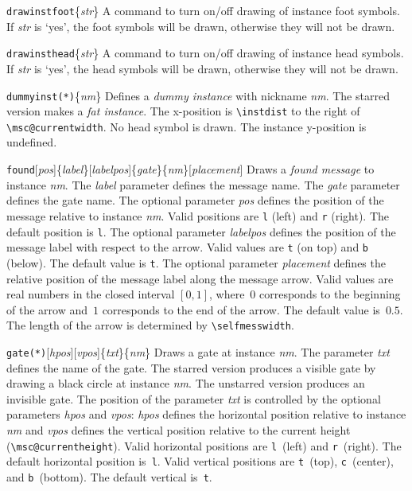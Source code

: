 \documentclass[a4paper]{article}
\newcommand{\cmd}[1]{\texttt{\bslash #1}}
\newcommand{\opt}[1]{[#1]}
\newenvironment{defs}{%
  \begin{list}{}%
              {\setlength{\labelwidth}{0pt}%
               \setlength{\labelsep}{1em}%
               \setlength{\leftmargin}{1em}%
               \setlength{\parsep}{1ex}%
               \setlength{\listparindent}{0pt}%
               \setlength{\rightmargin}{0pt}%
               \renewcommand{\makelabel}[1]{##1}%
               \raggedright%
              }%
  }{%
  \end{list}}
\begin{document}
\begin{defs}
\item[\cmd{drawinstfoot}\{\emph{str}\}] A command to turn on/off
drawing of instance foot symbols. If \emph{str} is `yes', the foot
symbols will be drawn, otherwise they will not be drawn.

\item[\cmd{drawinsthead}\{\emph{str}\}] A command to turn on/off
drawing of instance head symbols. If \emph{str} is `yes', the head
symbols will be drawn, otherwise they will not be drawn.

\item[\cmd{dummyinst(*)}\{\emph{nm}\}] Defines a \emph{dummy instance}
with nickname \emph{nm}. The starred version makes a \emph{fat
instance}. The x-position is \verb|\instdist| to the right of
\verb|\msc@currentwidth|. No head symbol is drawn. The
instance y-position is undefined.

\item[\cmd{found}\opt{\emph{pos}}\{\emph{label}\}\opt{\emph{labelpos}}\{\emph{gate}\}\{\emph{nm}\}\opt{\emph{placement}}]
Draws a \emph{found message} to instance \emph{nm}. The \emph{label}
parameter defines the message name. The \emph{gate} parameter defines
the gate name.  The optional parameter \emph{pos} defines the position
of the message relative to instance \emph{nm}. Valid positions are
\verb|l| (left) and \verb|r| (right). The default position is
\verb|l|.  The optional parameter \emph{labelpos} defines the position
of the message label with respect to the arrow. Valid values are
\verb+t+ (on top) and \verb+b+ (below). The default value is \verb+t+.
The optional parameter \emph{placement} defines the relative position
of the message label along the message arrow. Valid values are real
numbers in the closed interval $[0,1]$, where~$0$ corresponds to the
beginning of the arrow and~$1$ corresponds to the end of the
arrow. The default value is~$0.5$. The length of the arrow is
determined by \verb+\selfmesswidth+.

\item[\cmd{gate(*)}\opt{\emph{hpos}}\opt{\emph{vpos}}\{\emph{txt}\}\{\emph{nm}\}]
Draws a gate at instance \emph{nm}. The parameter \emph{txt} defines
the name of the gate. The starred version produces a visible gate by
drawing a black circle at instance \emph{nm}. The unstarred version
produces an invisible gate. The position of the parameter \emph{txt}
is controlled by the optional parameters \emph{hpos} and \emph{vpos}:
\emph{hpos} defines the horizontal position relative to instance
\emph{nm} and \emph{vpos} defines the vertical position relative to
the current height (\verb|\msc@currentheight|). Valid horizontal
positions are \verb|l|~(left) and \verb|r|~(right). The default
horizontal position is~\verb|l|.  Valid vertical positions are
\verb|t|~(top), \verb|c|~(center), and \verb|b|~(bottom). The default
vertical is~\verb|t|.


\end{defs}
\end{document}
